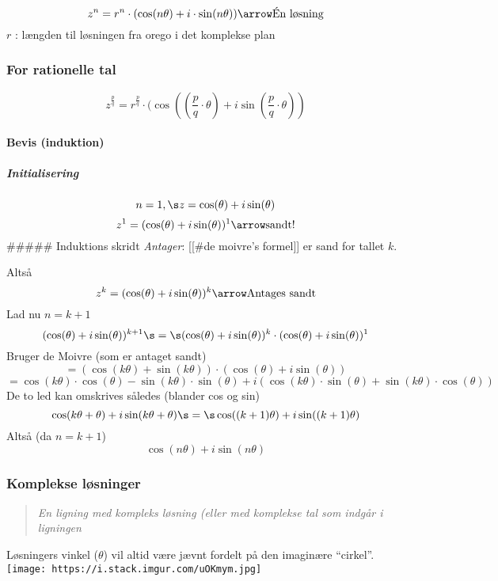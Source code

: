 \[z^n = r^n \cdot (\cos(n\theta) + i \cdot \sin(n\theta)) \arrow \text{Én løsning}\]
\(r\) : længden til løsningen fra orego i det komplekse plan

\hypertarget{for-rationelle-tal}{%
\subsubsection{For rationelle tal}\label{for-rationelle-tal}}

\[z^{\frac{p}{q}} = r^{\frac{p}{q}}\cdot (\cos((\frac{p}{q} \cdot \theta) + i \sin(\frac{p}{q} \cdot \theta))\]

\hypertarget{bevis-induktion}{%
\paragraph{Bevis (induktion)}\label{bevis-induktion}}

\hypertarget{initialisering}{%
\subparagraph{Initialisering}\label{initialisering}}

\[n = 1,\s z = \cos(\theta) + i \sin(\theta)\]
\[z^1= (\cos(\theta) + i \sin(\theta))^1 \arrow \text{sandt!}\]
\#\#\#\#\# Induktions skridt \emph{Antager}: {[}{[}\#de moivre's
formel{]}{]} er sand for tallet \(k\).

Altså
\[z^k= (\cos(\theta) + i \sin(\theta))^k \arrow \text{Antages sandt}\]
Lad nu \(n = k +1\)
\[(\cos(\theta) + i \sin(\theta))^{k+1} \s=\s (\cos(\theta) + i \sin(\theta))^{k} \cdot (\cos(\theta) + i \sin(\theta))^{1}\]
Bruger de Moivre (som er antaget sandt)
\[= (\cos(k\theta) + \sin(k\theta)) \cdot (\cos(\theta) + i \sin(\theta))\]
\[= \cos(k\theta) \cdot \cos(\theta) - \sin(k\theta) \cdot \sin(\theta) + i(\cos(k\theta) \cdot \sin(\theta) + \sin(k\theta) \cdot \cos(\theta))\]
De to led kan omskrives således (blander cos og sin)
\[\cos(k\theta+\theta)+i\sin(k\theta + \theta) \s=\s \cos((k+1)\theta) + i\sin((k+1)\theta)\]
Altså (da \(n = k +1\)) \[\cos(n\theta) + i\sin(n\theta)\]

\hypertarget{komplekse-luxf8sninger}{%
\subsubsection{Komplekse løsninger}\label{komplekse-luxf8sninger}}

\begin{quote}
\emph{En ligning med kompleks løsning (eller med komplekse tal som
indgår i ligningen}
\end{quote}

Løsningers vinkel (\(\theta\)) vil altid være jævnt fordelt på den
imaginære ``cirkel''.
\texttt{[image: https://i.stack.imgur.com/uOKmym.jpg]}

